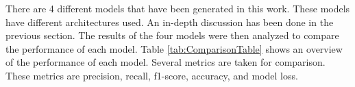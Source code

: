 There are 4 different models that have been generated in this work. These models have different architectures used. An in-depth discussion has been done in the previous section. The results of the four models were then analyzed to compare the performance of each model. Table \ref{tab:ComparisonTable} shows an overview of the performance of each model. Several metrics are taken for comparison. These metrics are precision, recall, f1-score, accuracy, and model loss.

